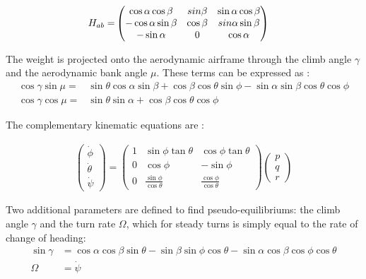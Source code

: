 \begin{align}
H_{ab} =& 
\begin{pmatrix}
\cos\alpha \cos\beta & sin\beta & \sin\alpha \cos\beta\\
-\cos\alpha \sin\beta & \cos\beta & \-sin\alpha \sin\beta\\
-\sin\alpha & 0 & \cos\alpha 
\end{pmatrix}
\end{align}

The weight is projected onto the aerodynamic airframe through the climb angle $\gamma$ and the aerodynamic bank angle $\mu$. These terms can be expressed as \cite{Boiffier}:
\begin{align}
\cos\gamma \sin\mu =& \sin\theta \cos\alpha \sin\beta + \cos\beta\cos\theta\sin\phi - \sin\alpha\sin\beta\cos\theta\cos\phi\\
\cos\gamma \cos\mu =& \sin\theta\sin\alpha + \cos\beta\cos\theta\cos\phi
\end{align}

The complementary kinematic equations are :

\begin{align}
\begin{pmatrix}
\dot{\phi}\\
\dot{\theta}\\
\dot{\psi}
\end{pmatrix}
= \begin{pmatrix}
1 & \sin\phi \tan\theta & \cos\phi \tan\theta\\
0 & \cos\phi & -\sin \phi\\
0 &\frac{\sin\phi}{\cos\theta} & \frac{\cos \phi}{\cos \theta}
\end{pmatrix}
\begin{pmatrix}
p\\
q\\
r
\end{pmatrix} \label{E:kinematics}
\end{align}

Two additional parameters are defined to find pseudo-equilibriums: the climb angle $\gamma$ and the turn rate $\Omega$, which for steady turns is simply equal to the rate of change of heading:
\begin{align}
\sin \gamma &= \cos\alpha\cos\beta\sin\theta - \sin\beta\sin\phi\cos\theta - \sin\alpha\cos\beta\cos\phi\cos\theta \label{E:gammaDef}\\
\Omega &= \dot{\psi} \label{E:OmegaDef}
\end{align}

